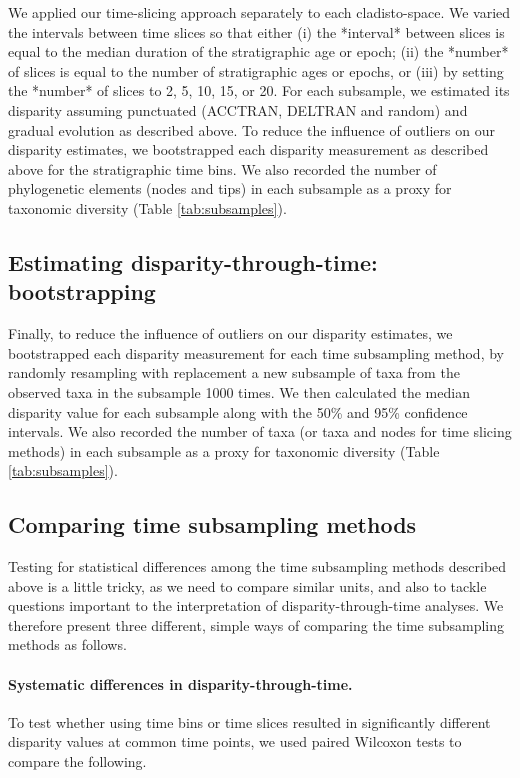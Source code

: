 \documentclass[12pt,a4paper]{article}
\begin{document}
We applied our time-slicing approach separately to each cladisto-space.
We varied the intervals between time slices so that either (i) the *interval* between slices is equal to the median duration of the stratigraphic age or epoch; (ii) the *number* of slices is equal to the number of stratigraphic ages or epochs, or (iii) by setting the *number* of slices to 2, 5, 10, 15, or 20.
For each subsample, we estimated its disparity assuming punctuated (ACCTRAN, DELTRAN and random) and gradual evolution as described above. %
To reduce the influence of outliers on our disparity estimates, we bootstrapped each disparity measurement as described above for the stratigraphic time bins. 
We also recorded the number of phylogenetic elements (nodes and tips) in each subsample as a proxy for taxonomic diversity (Table \ref{tab:subsamples}).


\subsection{Estimating disparity-through-time: bootstrapping}
Finally, to reduce the influence of outliers on our disparity estimates, we bootstrapped each disparity measurement for each time subsampling method, by randomly resampling with replacement a new subsample of taxa from the observed taxa in the subsample 1000 times.
We then calculated the median disparity value for each subsample along with the 50\% and 95\% confidence intervals.
We also recorded the number of taxa (or taxa and nodes for time slicing methods) in each subsample as a proxy for taxonomic diversity (Table \ref{tab:subsamples}).

\subsection{Comparing time subsampling methods}
\label{testing}
Testing for statistical differences among the time subsampling methods described above is a little tricky, as we need to compare similar units, and also to tackle questions important to the interpretation of disparity-through-time analyses. 
We therefore present three different, simple ways of comparing the time subsampling methods as follows.

\paragraph{Systematic differences in disparity-through-time.} 
To test whether using time bins or time slices resulted in significantly different disparity values at common time points, we used paired Wilcoxon tests to compare the following. 
\end{document}

